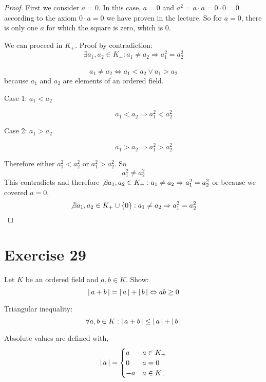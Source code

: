 \documentclass[a4paper]{article}
\theoremstyle{definition}
\newcommand\abs[1]{\left|\thinspace #1\thinspace\right|}
\newcommand\set[1]{\left\{#1\right\}}
\begin{document}
\begin{proof}
  First we consider $a = 0$. In this case, $a = 0$ and $a^2 = a \cdot a = 0 \cdot 0 = 0$
  according to the axiom $0 \cdot a = 0$ we have proven in the lecture.
  So for $a = 0$, there is only one $a$ for which the square is zero, which is $0$.

  We can proceed in $K_+$. Proof by contradiction:
  \[ \exists a_1, a_2 \in K_+: a_1 \neq a_2 \Rightarrow a_1^2 = a_2^2 \]

  \[
    a_1 \neq a_2 \Leftrightarrow a_1 < a_2 \dot\lor a_1 > a_2
  \]
  because $a_1$ and $a_2$ are elements of an ordered field.

  \begin{description}
    \item[Case 1: $a_1 < a_2$]
      \[ a_1 < a_2 \Rightarrow a_1^2 < a_2^2 \]
    \item[Case 2: $a_1 > a_2$]
      \[ a_1 > a_2 \Rightarrow a_1^2 > a_2^2 \]
  \end{description}

  Therefore either $a_1^2 < a_2^2$ or $a_1^2 > a_2^2$. So
  \[ a_1^2 \neq a_2^2 \]
  This contradicts and therefore $\not\exists a_1, a_2 \in K_+: a_1 \neq a_2 \Rightarrow a_1^2 = a_2^2$
  or because we covered $a = 0$,
  \[ \not\exists a_1, a_2 \in K_+ \cup \set{0}: a_1 \neq a_2 \Rightarrow a_1^2 = a_2^2 \]
\end{proof}

\section{Exercise 29}
\begin{ex}
  Let $K$ be an ordered field and $a,b \in K$. Show:
  \[ \abs{a + b} = \abs{a} + \abs{b} \Leftrightarrow ab \geq 0 \]
\end{ex}

Triangular inequality:
\[ \forall a, b \in K: \abs{a + b} \leq \abs{a} + \abs{b} \]

Absolute values are defined with,
\[
  \abs{a} = \begin{cases}
     a & a \in K_+ \\
     0 & a = 0 \\
    -a & a \in K_-
  \end{cases}
\]
\end{document}

